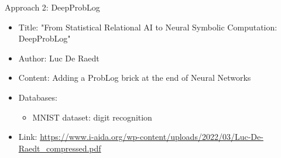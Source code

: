 \begin{frame}{Approach 2: DeepProbLog}

\begin{itemize}
\vfill
    \item Title: "From Statistical Relational AI to
Neural Symbolic Computation: DeepProbLog"
\vfill
    \item Author: Luc De Raedt
\vfill
    \item Content: Adding a ProbLog brick at the end of Neural Networks
\vfill
    \item Databases: 
    \begin{itemize}
        \item MNIST dataset: digit recognition
    \end{itemize} 
\vfill
    \item Link: \url{https://www.i-aida.org/wp-content/uploads/2022/03/Luc-De-Raedt_compressed.pdf}
\vfill
\end{itemize}
    
\end{frame}

